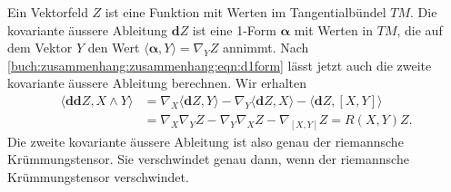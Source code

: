 Ein Vektorfeld $Z$ ist eine Funktion mit Werten im Tangentialbündel $TM$.
Die kovariante äussere Ableitung $\boldsymbol{d}Z$ ist eine 1-Form
$\boldsymbol{\alpha}$ mit Werten in $TM$, die auf dem Vektor $Y$ den
Wert $\langle\boldsymbol{\alpha},Y\rangle=\nabla_YZ$ annimmt.
Nach \eqref{buch:zusammenhang:zusammenhang:eqn:d1form} lässt jetzt
auch die zweite kovariante äussere Ableitung berechnen.
Wir erhalten
\begin{align*}
\langle
\boldsymbol{d} \boldsymbol{d} Z
,
X\wedge Y\rangle
&=
\nabla_X\langle\boldsymbol{d}Z,Y\rangle
-
\nabla_Y\langle\boldsymbol{d}Z,X\rangle
-
\langle \boldsymbol{d}Z, [X,Y]\rangle
\\
&=
\nabla_X\nabla_YZ
-
\nabla_Y\nabla_XZ
-
\nabla_{[X,Y]}Z
=
R(X,Y)Z.
\end{align*}
Die zweite kovariante äussere Ableitung ist also genau der riemannsche
Krümmungstensor.
Sie verschwindet genau dann, wenn der riemannsche Krümmungstensor
verschwindet.




